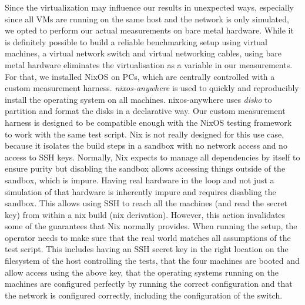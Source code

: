 Since the virtualization may influence our results in unexpected ways, especially since all VMs are running on the same host and the network is only simulated, we opted to perform our actual measurements on bare metal hardware.
While it is definitely possible to build a reliable benchmarking setup using virtual machines, a virtual network switch and virtual networking cables, using bare metal hardware eliminates the virtualisation as a variable in our measurements.
For that, we installed NixOS on PCs, which are centrally controlled with a custom measurement harness.
\textit{nixos-anywhere} \cite{nixos-anywhere} is used to quickly and reproducibly install the operating system on all machines.
nixos-anywhere uses \textit{disko} \cite{disko} to partition and format the disks in a declarative way.
Our custom measurement harness is designed to be compatible enough with the NixOS testing framework to work with the same test script.
Nix is not really designed for this use case, because it isolates the build steps in a sandbox with no network access and no access to SSH keys.
Normally, Nix expects to manage all dependencies by itself to ensure purity but disabling the sandbox allows accessing things outside of the sandbox, which is impure.
Having real hardware in the loop and not just a simulation of that hardware is inherently impure and requires disabling the sandbox.
This allows using SSH to reach all the machines (and read the secret key) from within a nix build (nix derivation).
However, this action invalidates some of the guarantees that Nix normally provides.
When running the setup, the operator needs to make sure that the real world matches all assumptions of the test script.
This includes having an SSH secret key in the right location on the filesystem of the host controlling the tests, that the four machines are booted and allow access using the above key, that the operating systems running on the machines are configured perfectly by running the correct configuration and that the network is configured correctly, including the configuration of the switch.

